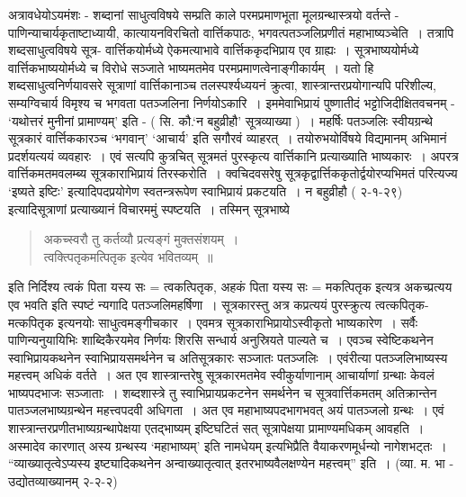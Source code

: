 {अत्रावधेयोऽयमंशः - शब्दानां साधुत्वविषये सम्प्रति काले परमप्रमाणभूता मूलग्रन्था\-स्त्रयो वर्तन्ते - पाणिन्याचार्यकृताष्टाध्यायी, कात्यायनविरचितो वार्त्तिकपाठः, भगवत्पत\-ञ्जलिप्रणीतं महाभाष्यञ्चेति~। तत्रापि शब्दसाधुत्वविषये सूत्र- वार्त्तिकयोर्मध्ये ऐकमत्याभावे वार्त्तिककृदभिप्राय एव ग्राह्यः~। सूत्रभाष्ययोर्मध्ये वार्त्तिकभाष्ययोर्मध्ये च विरोधे सञ्जाते भाष्यमतमेव परमप्रमाणत्वेनाङ्गीकार्यम्~। यतो हि शब्दसाधुत्वनिर्णयावसरे सूत्राणां वार्त्तिकानाञ्च तलस्पर्श्यध्ययनं क्रुत्वा, शास्त्रान्तरप्रयोगान्यपि परिशील्य, सम्यग्विचार्य विमृश्य च भगवता पतञ्जलिना निर्णयोऽकारि~। इममेवाभिप्रायं पुष्णातीदं भट्टोजिदीक्षितवचनम् - ‘यथोत्तरं मुनीनां प्रामाण्यम्’ इति - ( सि. कौ.‘न बहुव्रीहौ’ सूत्रव्याख्या )~। महर्षिः पतञ्जलिः स्वीयग्रन्थे सूत्रकारं वार्त्तिककारञ्च ‘भगवान्’ ‘आचार्य’ इति सगौरवं व्याहरत्~। तयोरुभयोर्विषये विद्यमानम् अभिमानं प्रदर्शयत्ययं व्यवहारः~। एवं सत्यपि कुत्रचित् सूत्रमतं पुरस्कृत्य वार्त्तिकानि प्रत्याख्याति भाष्यकारः~। अपरत्र वार्त्तिकमतमवलम्ब्य सूत्रकाराभिप्रायं तिरस्करोति~। क्वचिदवसरेषु सूत्रकृद्वार्त्तिककृतोर्द्वयोरप्यभिमतं परित्यज्य ‘इष्यते इष्टिः’ इत्यादिपदप्रयोगेण स्वतन्त्ररूपेण स्वाभिप्रायं प्रकटयति~। न बहुव्रीहौ ( २-१-२९) इत्यादिसूत्राणां प्रत्याख्यानं विचारममुं स्पष्टयति~। तस्मिन् सूत्रभाष्ये
\begin{verse}
अकच्स्वरौ तु कर्तव्यौ प्रत्यङ्गं मुक्तसंशयम्~। \\
त्वक्त्पितृकमत्पितृक इत्येव भवितव्यम्~॥
\end{verse}
इति निर्दिश्य त्वकं पिता यस्य सः = त्वकत्पितृक, अहकं पिता यस्य सः = मकत्पितृक इत्यत्र अकच्प्रत्यय एव भवति इति स्पष्टं न्यगादि पतञ्जलिमहर्षिणा~। सूत्रकारस्तु अत्र कप्रत्ययं पुरस्क्रुत्य त्वत्कपितृक-मत्कपितृक इत्यनयोः साधुत्वमङ्गीचकार~। एवमत्र सूत्रकाराभिप्रायोऽस्वीकृतो भाष्यकारेण~। सर्वैः पाणिन्यनुयायिभिः शाब्दिकैरयमेव निर्णयः शिरसि सन्धार्य अनुस्रियते पाल्यते च~। एवञ्च स्वेष्टिकथनेन स्वाभिप्रायकथनेन स्वाभिप्रायसमर्थनेन च अतिसूत्रकारः सञ्जातः पतञ्जलिः~। एवंरीत्या पतञ्जलिभाष्यस्य महत्त्वम् अधिकं वर्तते~। अत एव शास्त्रान्तरेषु सूत्रकारमतमेव स्वीकुर्याणानाम् आचार्याणां ग्रन्थाः केवलं भाष्यपदभाजः सञ्जाताः~। शब्दशास्त्रे तु स्वाभिप्रायप्रकटनेन समर्थनेन च सूत्रवार्त्तिकमतम् अतिक्रान्तेन पातञ्जलभाष्यग्रन्थेन महत्त्वपदवी अधिगता~। अत एव महाभाष्यपदभागभवत् अयं पातञ्जलो ग्रन्थः~। एवं शास्त्रान्तरप्रणीतभाष्यग्रन्थापेक्षया एतद्भाष्यम् इष्टिघटितं सत् सूत्रापेक्षया प्रामाण्यमधिकम् आवहति~। अस्मादेव कारणात् अस्य ग्रन्थस्य ‘महाभाष्यम्’ इति नामधेयम् इत्यभिप्रैति वैयाकरणमूर्धन्यो नागेशभट्तः~। “व्याख्यातृत्वेऽप्यस्य इष्ट्यादिकथनेन अन्वाख्यातृत्वात् इतरभाष्यवैलक्षण्येन महत्त्वम्” इति~। (व्या. म. भा - उद्योतव्याख्यानम् २-२-२)

}
